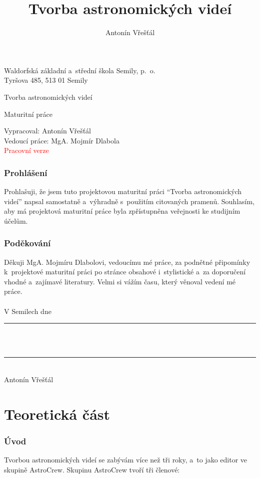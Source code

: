 \documentclass[12pt,a4paper,titlepage]{article}
\author{Antonín Vřešťál}
\title{Tvorba astronomických videí}
\begin{document}
\begin{titlepage}
	\begin{center}
		Waldorfská základní a~střední škola Semily, p.\  o.\\
		Tyršova 485, 513 01 Semily
		\vspace*{1cm}
 
		\vfill		

		\Huge
		Tvorba astronomických videí
 
		\normalsize
		\vspace{0.5cm}
		Maturitní práce 	 
		 
		\vfill		
	\end{center}
	Vypracoval: Antonín Vřešťál\\
	Vedoucí práce: MgA. Mojmír Dlabola\\
	\textcolor{red}{Pracovní verze}\\
 \end{titlepage}
\newpage
\section*{Prohlášení}
Prohlašuji, že jsem tuto projektovou maturitní práci \enquote{Tvorba astronomických videí} napsal samostatně a~výhradně s~použitím citovaných pramenů. Souhlasím, aby má projektová maturitní práce byla zpřístupněna veřejnosti ke studijním účelům.
\section*{Poděkování}
Děkuji MgA. Mojmíru Dlabolovi, vedoucímu mé práce, za podnětné připomínky k~projektové maturitní práci po stránce obsahové i~stylistické a~za doporučení vhodné a~zajímavé literatury. Velmi si vážím času, který věnoval vedení mé práce.\\
\\
V Semilech dne \hspace{0.05cm} \rule[-3pt]{4cm}{0.5pt}\\
\\
\hspace{0.5cm} \rule[-3pt]{5.5cm}{0.5pt}\\
\indent \indent Antonín Vřešťál\\

\newpage
\tableofcontents
\newpage
\part{Teoretická část}
\section{Úvod}
Tvorbou astronomických videí se zabývám více než tři roky, a~to jako editor ve skupině AstroCrew. Skupinu AstroCrew tvoří tři členové:
\end{document}
